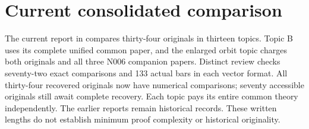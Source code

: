 \documentclass[11pt,a4paper]{article}
\begin{document}
\section*{Current consolidated comparison}
The current report in  compares thirty-four originals
in thirteen topics. Topic B uses its complete unified common paper, and the
enlarged orbit topic charges both originals and all three N006 companion
papers. Distinct review checks seventy-two exact comparisons and 133 actual
bars in each vector format. All thirty-four recovered originals now have
numerical comparisons; seventy accessible originals still await complete
recovery. Each topic pays its entire common theory independently.
The earlier reports remain historical records. These written lengths do
not establish minimum proof complexity or historical originality.
\end{document}
